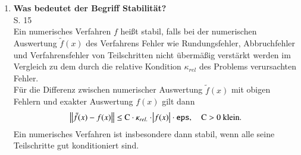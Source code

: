 \begin{enumerate}
		\item \textbf{Was bedeutet der Begriff Stabilität?} \\
		S. 15\\
		Ein numerisches Verfahren \(f\) heißt stabil, falls bei der numerischen Auswertung \(\tilde{f}(x)\) des Verfahrens Fehler wie Rundungsfehler, Abbruchfehler und Verfahrensfehler von Teilschritten nicht	übermäßig verstärkt werden im Vergleich zu dem durch die relative Kondition \(\kappa_{rel}\) des Problems verursachten Fehler. \\
		Für die Differenz zwischen numerischer Auswertung \(\tilde{f}(x)\) mit obigen Fehlern und exakter Auswertung \(f(x)\) gilt dann
		\begin{align*}
			\norm{\tilde{f}(x)-f(x)}\leq \text{C}\cdot\kappa_{rel.}\cdot\abs{f(x)}\cdot\texttt{eps}, \quad \text{C} > 0 \text{ klein.}
		\end{align*}
		Ein numerisches Verfahren ist insbesondere dann stabil, wenn alle seine Teilschritte gut konditioniert sind.
		
	\end{enumerate}